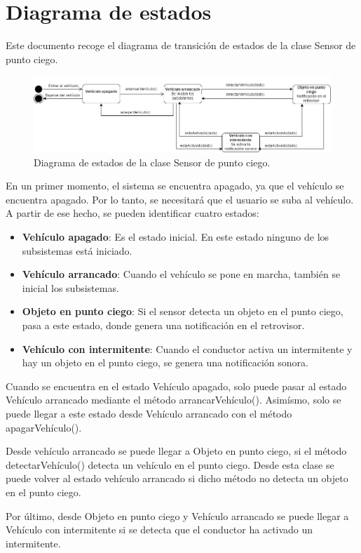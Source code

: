 \chapter{Diagrama de estados}

\par Este documento recoge el diagrama de transición de estados de la clase Sensor de punto ciego.

\begin{figure}[h]
\begin{center}
\includegraphics[width=1\textwidth]{./img/diagramadeestados.png}
\end{center}
\caption{Diagrama de estados de la clase Sensor de punto ciego.}
\label{tab:d_EstadosPNG}
\end{figure}

\par En un primer momento, el sistema se encuentra apagado, ya que el vehículo se encuentra apagado. Por lo tanto,
se necesitará que el usuario se suba al vehículo. A partir de ese hecho, se pueden identificar cuatro estados:
\begin{itemize}
  \item \textbf{Vehículo apagado}: Es el estado inicial. En este estado ninguno de los subsistemas está iniciado.
  \item \textbf{Vehículo arrancado}: Cuando el vehículo se pone en marcha, también se inicial los subsistemas.
  \item \textbf{Objeto en punto ciego}: Si el sensor detecta un objeto en el punto ciego, pasa a este estado, donde genera una notificación en el retrovisor.
  \item \textbf{Vehículo con intermitente}: Cuando el conductor activa un intermitente y hay un objeto en el punto ciego, se genera una notificación sonora.
\end{itemize}

\par Cuando se encuentra en el estado Vehículo apagado, solo puede pasar al estado Vehículo arrancado mediante el método arrancarVehículo(). Asimísmo, solo se puede llegar a
este estado desde Vehículo arrancado con el método apagarVehículo().

Desde vehículo arrancado se puede llegar a Objeto en punto ciego, si el método detectarVehículo() detecta un vehículo en el punto ciego. Desde esta clase se puede volver al estado
vehículo arrancado si dicho método no detecta un objeto en el punto ciego.

Por último, desde Objeto en punto ciego y Vehículo arrancado se puede llegar a Vehículo con intermitente si se detecta que el conductor ha activado un intermitente.
